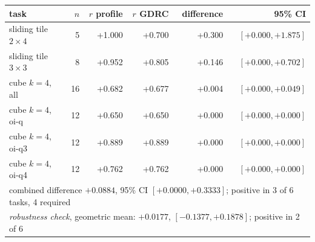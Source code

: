 \begin{tabular}{lrrrrr}
\toprule
task & $n$ & $r$ profile & $r$ GDRC & difference & 95\% CI \\
\midrule
sliding tile $2\times4$ & 5 & +1.000 & +0.700 & +0.300 & $[+0.000, +1.875]$ \\
sliding tile $3\times3$ & 8 & +0.952 & +0.805 & +0.146 & $[+0.000, +0.702]$ \\
cube $k\!=\!4$, all & 16 & +0.682 & +0.677 & +0.004 & $[+0.000, +0.049]$ \\
cube $k\!=\!4$, oi-q & 12 & +0.650 & +0.650 & +0.000 & $[+0.000, +0.000]$ \\
cube $k\!=\!4$, oi-q3 & 12 & +0.889 & +0.889 & +0.000 & $[+0.000, +0.000]$ \\
cube $k\!=\!4$, oi-q4 & 12 & +0.762 & +0.762 & +0.000 & $[+0.000, +0.000]$ \\
\midrule
\multicolumn{6}{l}{combined difference $+0.0884$, 95\% CI $[+0.0000, +0.3333]$; positive in 3 of 6 tasks, 4 required} \\
\multicolumn{6}{l}{\emph{robustness check}, geometric mean: $+0.0177$, $[-0.1377, +0.1878]$; positive in 2 of 6} \\
\bottomrule
\end{tabular}